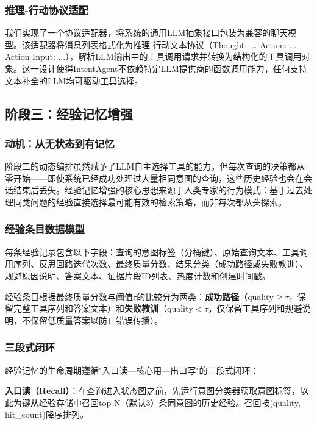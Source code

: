 \documentclass[runningheads]{llncs}
\begin{document}
\subsubsection{推理-行动协议适配}

我们实现了一个协议适配器，将系统的通用LLM抽象接口包装为兼容的聊天模型。该适配器将消息列表格式化为推理-行动文本协议（Thought: ... Action: ... Action Input: ...），解析LLM输出中的工具调用请求并转换为结构化的工具调用对象。这一设计使得IntentAgent不依赖特定LLM提供商的函数调用能力，任何支持文本补全的LLM均可驱动工具选择。

\subsection{阶段三：经验记忆增强}

\subsubsection{动机：从无状态到有记忆}

阶段二的动态编排虽然赋予了LLM自主选择工具的能力，但每次查询的决策都从零开始——即使系统已经成功处理过大量相同意图的查询，这些历史经验也会在会话结束后丢失。经验记忆增强的核心思想来源于人类专家的行为模式：基于过去处理同类问题的经验直接选择最可能有效的检索策略，而非每次都从头探索。

\subsubsection{经验条目数据模型}

每条经验记录包含以下字段：查询的意图标签（分桶键）、原始查询文本、工具调用序列、反思回路迭代次数、最终质量分数、结果分类（成功路径或失败教训）、规避原因说明、答案文本、证据片段ID列表、热度计数和创建时间戳。

经验条目根据最终质量分数与阈值$\tau$的比较分为两类：\textbf{成功路径}（$\text{quality} \geq \tau$，保留完整工具序列和答案文本）和\textbf{失败教训}（$\text{quality} < \tau$，仅保留工具序列和规避说明，不保留低质量答案以防止错误传播）。

\subsubsection{三段式闭环}

经验记忆的生命周期遵循"入口读—核心用—出口写"的三段式闭环：

\textbf{入口读（Recall）}：在查询进入状态图之前，先运行意图分类器获取意图标签，以此为键从经验存储中召回top-N（默认3）条同意图的历史经验。召回按(quality, hit\_count)降序排列。
\end{document}
